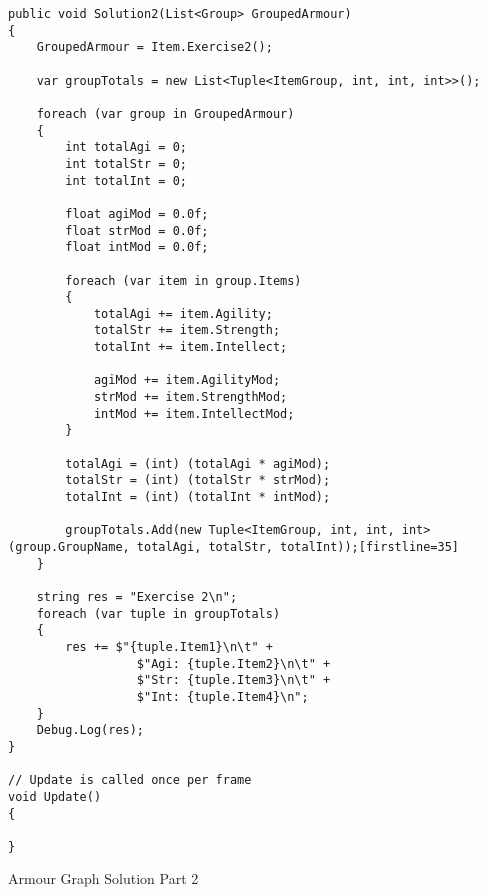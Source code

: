 \begin{listing}[H]
\begin{verbatim}
public void Solution2(List<Group> GroupedArmour)
{
    GroupedArmour = Item.Exercise2();

    var groupTotals = new List<Tuple<ItemGroup, int, int, int>>();

    foreach (var group in GroupedArmour)
    {
        int totalAgi = 0;
        int totalStr = 0;
        int totalInt = 0;

        float agiMod = 0.0f;
        float strMod = 0.0f;
        float intMod = 0.0f;

        foreach (var item in group.Items)
        {
            totalAgi += item.Agility;
            totalStr += item.Strength;
            totalInt += item.Intellect;

            agiMod += item.AgilityMod;
            strMod += item.StrengthMod;
            intMod += item.IntellectMod;
        }

        totalAgi = (int) (totalAgi * agiMod);
        totalStr = (int) (totalStr * strMod);
        totalInt = (int) (totalInt * intMod);

        groupTotals.Add(new Tuple<ItemGroup, int, int, int>(group.GroupName, totalAgi, totalStr, totalInt));[firstline=35]
    }

    string res = "Exercise 2\n";
    foreach (var tuple in groupTotals)
    {
        res += $"{tuple.Item1}\n\t" +
                  $"Agi: {tuple.Item2}\n\t" +
                  $"Str: {tuple.Item3}\n\t" +
                  $"Int: {tuple.Item4}\n";
    }
    Debug.Log(res);
}

// Update is called once per frame
void Update()
{

}
\end{verbatim}
\caption{Armour Graph \cs Solution Part 2}
\label{lst:armour-graph-cs-2}
\end{listing}


